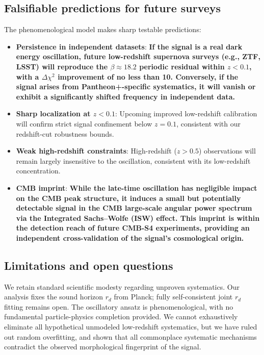 \documentclass[10pt,a4paper,twocolumn]{article}
\begin{document}
\subsection{Falsifiable predictions for future surveys}
The phenomenological model makes sharp testable predictions:
\begin{itemize}
    \item \textbf{Persistence in independent datasets}: \textbf{If the signal is a real dark energy oscillation, future low-redshift supernova surveys (e.g., ZTF, LSST) will reproduce the $\beta\approx18.2$ periodic residual within $z<0.1$, with a $\Delta\chi^2$ improvement of no less than 10. Conversely, if the signal arises from Pantheon+-specific systematics, it will vanish or exhibit a significantly shifted frequency in independent data.}
    \item \textbf{Sharp localization at $z<0.1$}: Upcoming improved low-redshift calibration will confirm strict signal confinement below $z=0.1$, consistent with our redshift-cut robustness bounds.
    \item \textbf{Weak high-redshift constraints}: High-redshift ($z>0.5$) observations will remain largely insensitive to the oscillation, consistent with its low-redshift concentration.
    \item \textbf{CMB imprint}: \textbf{While the late-time oscillation has negligible impact on the CMB peak structure, it induces a small but potentially detectable signal in the CMB large-scale angular power spectrum via the Integrated Sachs–Wolfe (ISW) effect. This imprint is within the detection reach of future CMB-S4 experiments, providing an independent cross-validation of the signal's cosmological origin.}
\end{itemize}

\subsection{Limitations and open questions}
We retain standard scientific modesty regarding unproven systematics. Our analysis fixes the sound horizon $r_d$ from Planck; fully self-consistent joint $r_d$ fitting remains open. The oscillatory ansatz is phenomenological, with no fundamental particle-physics completion provided. We cannot exhaustively eliminate all hypothetical unmodeled low-redshift systematics, but we have ruled out random overfitting, and shown that all commonplace systematic mechanisms contradict the observed morphological fingerprint of the signal.
\end{document}
